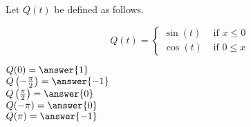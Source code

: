 \documentclass{ximera}
\author{Lee Wayand}
\begin{document}
\begin{exercise}




Let $Q(t)$ be defined as follows.

\[
Q(t) = 
\begin{cases}
  \sin(t) & \text{ if }  x \le 0 \\
  \cos(t) & \text{ if } 0 \leq x 
\end{cases}
\]



$Q(0) = \answer{1}$ \\


$Q\left( -\frac{\pi}{2} \right) = \answer{-1}$ \\


$Q\left( \frac{\pi}{2} \right) = \answer{0}$ \\


$Q(-\pi) = \answer{0}$ \\


$Q(\pi) = \answer{-1}$ \\




\end{exercise}
\end{document}
